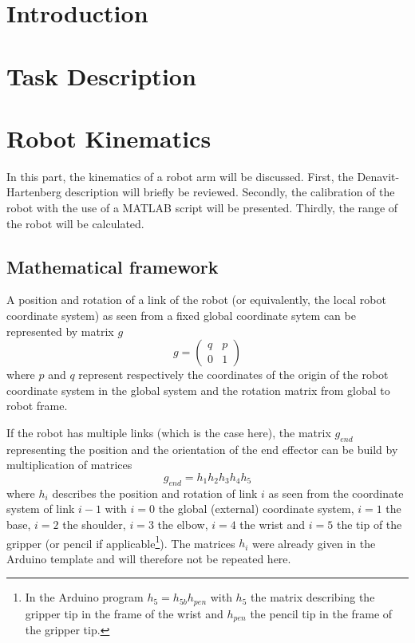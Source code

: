 \documentclass[a4paper,11pt,oneside,onecolumn]{article}
\begin{document}

\tableofcontents


\newpage
\setcounter{page}{0}

\section{Introduction}
\section{Task Description}

\section{Robot Kinematics}
In this part, the kinematics of a robot arm will be discussed. First, the Denavit-Hartenberg description will briefly be reviewed. Secondly, the calibration of the robot with the use of a MATLAB script will be presented. Thirdly, the range of the robot will be calculated.

\subsection{Mathematical framework}
A position and rotation of a link of the robot (or equivalently, the local robot coordinate system) as seen from a fixed global coordinate sytem can be represented by matrix $g$
\begin{equation}
g = \left(
\begin{matrix}
q & p \\
0 & 1
\end{matrix}
\right)
\end{equation}
where $p$ and $q$ represent respectively the coordinates of the origin of the robot coordinate system in the global system and the rotation matrix from global to robot frame.

If the robot has multiple links (which is the case here), the matrix $g_{end}$ representing the position and the orientation of the end effector can be build by multiplication of matrices
\begin{equation}
g_{end}=h_1h_2h_3h_4h_5
\label{directKin}
\end{equation}
where $h_i$ describes the position and rotation of link $i$ as seen from the coordinate system of link $i-1$ with $i=0$ the global (external) coordinate system, $i=1$ the base, $i=2$ the shoulder, $i=3$ the elbow, $i=4$ the wrist and $i=5$ the tip of the gripper (or pencil if applicable\footnote{In the Arduino program $h_5=h_{5b}h_{pen}$ with $h_5$ the matrix describing the gripper tip in the frame of the wrist and $h_{pen}$ the pencil tip in the frame of the gripper tip.}). The matrices $h_i$ were already given in the Arduino template and will therefore not be repeated here.
\end{document}
